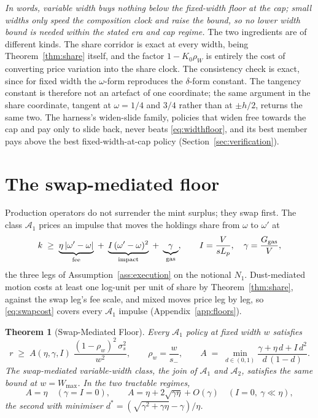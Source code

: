 \documentclass[11pt,a4paper]{article}
\theoremstyle{definition}
\theoremstyle{plain}
\newtheorem{theorem}{Theorem}
\theoremstyle{remark}
\begin{document}
\emph{In words, variable width buys nothing below the fixed-width floor at the cap; small widths only speed the composition clock and raise the bound, so no lower width bound is needed within the stated
era and cap regime.} The two ingredients are of different kinds. The share corridor is exact at every width, being Theorem~\ref{thm:share} itself, and the factor $1 - K_0 \rho_W$ is
entirely the cost of converting price variation into the share clock. The consistency check is exact, since for fixed width the $\omega$-form reproduces the $\delta$-form constant. The tangency 
constant is therefore not an artefact of one coordinate; the same argument in the share coordinate, tangent at $\omega = 1/4$ and $3/4$ rather than at $\pm
h/2$, returns the same two. The harness's widen-slide family, policies that widen free towards the cap and pay only to slide back, never beats
\eqref{eq:widthfloor}, and its best member pays above the best fixed-width-at-cap policy (Section~\ref{sec:verification}).

\section{The swap-mediated floor}\label{sec:swap}

Production operators do not surrender the mint surplus; they swap first. The class $\mathcal{A}_1$ prices an impulse that moves the holdings share from $\omega$ to $\omega'$ at
\begin{equation}\label{eq:swapcost}
k \;\ge\; \underbrace{\eta\,|\omega' - \omega|}_{\textnormal{fee}}
\;+\; \underbrace{I\,(\omega' - \omega)^2}_{\textnormal{impact}}
\;+\; \underbrace{\gamma}_{\textnormal{gas}},
\qquad I = \frac{V}{s L_p}, \quad
\gamma = \frac{G_{\mathrm{gas}}}{V},
\end{equation}
the three legs of Assumption~\ref{ass:execution} on the notional $N_1$. Dust-mediated motion costs at least one log-unit per unit of share by Theorem~\ref{thm:share}, against the swap leg's fee 
scale, and mixed moves price leg by leg, so \eqref{eq:swapcost} covers every $\mathcal{A}_1$ impulse (Appendix~\ref{app:floors}).

\begin{theorem}[Swap-Mediated Floor]\label{thm:swap}
Every $\mathcal{A}_1$ policy at fixed width $w$ satisfies
\begin{equation}\label{eq:swapfloor}
r \;\ge\; A(\eta, \gamma, I)\; \frac{(1 - \rho_w)^2\,\sigma_s^2}{w^2}, \qquad \rho_w = \frac{w}{s_-}, \qquad A \;=\; \min_{d \in (0, 1)} \frac{\gamma + \eta\,d + I\,d^2}{d\,(1 - d)}.
\end{equation}
The swap-mediated variable-width class, the join of $\mathcal{A}_1$ and $\mathcal{A}_2$, satisfies the same bound at $w = W_{\max}$. In the two tractable regimes,
\[
A = \eta \quad (\gamma = I = 0), \qquad
A = \eta + 2\sqrt{\gamma\eta} + O(\gamma) \quad
(I = 0,\ \gamma \ll \eta),
\]
the second with minimiser $d^* = (\sqrt{\gamma^2 + \gamma\eta} - \gamma)/\eta$.
\end{theorem}
\end{document}
